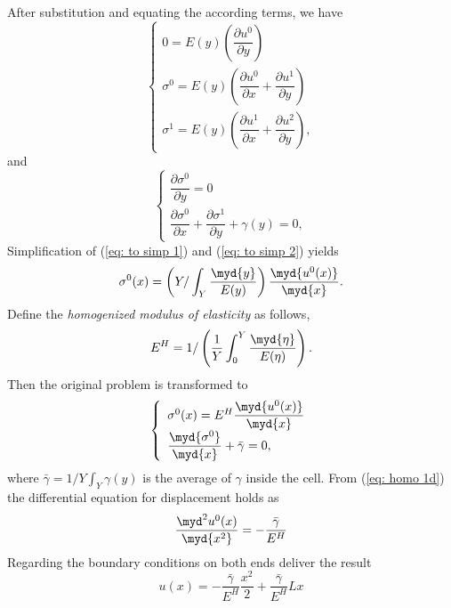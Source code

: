 After substitution and equating the according terms, we have
\begin{equation}
\label{eq: to simp 1}
\left\{
\begin{array}{l}
0 = E(y)\left( \dfrac{\partial u^{0}}{\partial y} \right) \\
\sigma^{0} = E(y) \left( \dfrac{\partial u^{0}}{\partial x} + \dfrac{\partial u^{1}}{\partial y} \right) \\
\sigma^{1} = E(y) \left( \dfrac{\partial u^{1}}{\partial x} + \dfrac{\partial u^{2}}{\partial y} \right),
\end{array}
\right.
\end{equation}
and
\begin{equation}
\label{eq: to simp 2}
\left\{
\begin{array}{l}
\dfrac{\partial \sigma^{0}}{\partial y}=0 \\
\dfrac{\partial \sigma^{0}}{\partial x} + \dfrac{\partial \sigma^{1}}{\partial y} + \gamma(y) = 0, 
\end{array}
\right.
\end{equation}
Simplification of (\ref{eq: to simp 1}) and (\ref{eq: to simp 2}) yields
\begin{equation}
\label{eq: sigma 0}
\sigma^{0}(x) = \left(Y/\int_{Y} \dfrac{\myd{y}}{E(y)} \right) \dfrac{\myd{u^{0}(x)}}{\myd{x}}.
\end{equation}
Define the \textit{homogenized modulus of elasticity} as follows,
\begin{equation}
E^{H} = 1/ \left( \dfrac{1}{Y} \int_{0}^{Y} \dfrac{\myd{\eta}}{E(\eta)}\right) .
\end{equation}
Then the original problem is transformed to
\begin{equation}
\label{eq: homo 1d}
\left\{
\begin{array}{l}
\sigma^{0}(x) = E^{H} \dfrac{\myd{u^{0}(x)}}{\myd{x}} \\
\dfrac{\myd{\sigma^{0}}}{\myd{x}} + \bar{\gamma} = 0,
\end{array}
\right.
\end{equation}
where $\bar{\gamma}=1/Y \int_{Y} \gamma(y)$ is the average of $\gamma$ inside the cell. From (\ref{eq: homo 1d}) the differential equation for displacement holds as
\begin{equation}
\dfrac{\myd^2 u^{0}(x)}{\myd{x^{2}}} = -\dfrac{\bar{\gamma}}{E^{H}}
\end{equation}
Regarding the boundary conditions on both ends deliver the result
\[u(x) = -\dfrac{\bar{\gamma}}{E^{H}} \dfrac{x^{2}}{2} + \dfrac{\bar{\gamma}}{E^{H}} Lx \]


